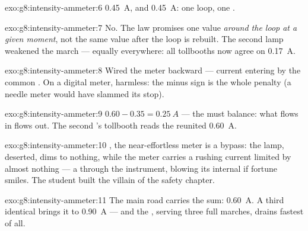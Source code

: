 \begin{solution}{exo:g8:intensity-ammeter:6}
\qty{0.45}{A}, and \qty{0.45}{A}: one loop, one .
\end{solution}

\begin{solution}{exo:g8:intensity-ammeter:7}
No. The law promises one value \emph{around the loop at a given
moment}, not the same value after the loop is rebuilt. The
second lamp weakened the march --- equally everywhere: all
tollbooths now agree on \qty{0.17}{A}.
\end{solution}

\begin{solution}{exo:g8:intensity-ammeter:8}
Wired the meter backward --- current entering by the common
. On a digital meter, harmless: the minus sign is the
whole penalty (a needle meter would have slammed its stop).
\end{solution}

\begin{solution}{exo:g8:intensity-ammeter:9}
$0.60 - 0.35 = \qty{0.25}{A}$ --- the  must balance:
what flows in flows out. The second 's tollbooth reads
the reunited \qty{0.60}{A}.
\end{solution}

\begin{solution}{exo:g8:intensity-ammeter:10}
, the near-effortless meter is a bypass: the lamp,
deserted, dims to nothing, while the meter carries a rushing
current limited by almost nothing --- a  through
the instrument, blowing its internal  if fortune smiles.
The student built the villain of the safety chapter.
\end{solution}

\begin{solution}{exo:g8:intensity-ammeter:11}
The main road carries the sum: \qty{0.60}{A}. A third identical
 brings it to \qty{0.90}{A} --- and the , serving
three full marches, drains fastest of all.
\end{solution}

